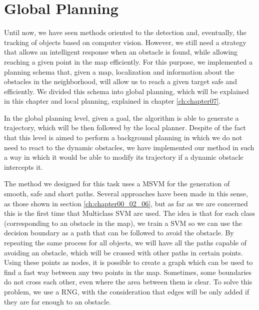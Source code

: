 
\graphicspath{{./images/chapter06/bmps/}{./images/chapter06/vects/}{./images/chapter06/}}

\chapter{Global Planning}\label{ch:chapter06}

Until now, we have seen methods oriented to the detection and, eventually, the tracking of objects based on computer vision. However, we still need a strategy that allows an intelligent response when an obstacle is found, while allowing reaching a given point in the map efficiently. For this purpose, we implemented a planning schema that, given a map, localization and information about the obstacles in the neighborhood, will allow us to reach a given target safe and efficiently. We divided this schema into global planning, which will be explained in this chapter and local planning, explained in chapter \ref{ch:chapter07}.

In the global planning level, given a goal, the algorithm is able to generate a trajectory, which will be then followed by the local planner. Despite of the fact that this level is aimed to perform a background planning in which we do not need to react to the dynamic obstacles, we have implemented our method in such a way in which it would be able to modify its trajectory if a dynamic obstacle intercepts it.

The method we designed for this task uses a \ac{MSVM} for the generation of smooth, safe and short paths. Several approaches have been made in this sense, as those shown in section \ref{ch:chapter00_02_06}, but as far as we are concerned this is the first time that Multiclass \acs{SVM} are used. The idea is that for each class (corresponding to an obstacle in the map), we train a \ac{SVM} so we can use the decision boundary as a path that can be followed to avoid the obstacle. By repeating the same process for all objects, we will have all the paths capable of avoiding an obstacle, which will be crossed with other paths in certain points. Using these points as nodes, it is possible to create a graph which can be used to find a fast way between any two points in the map. Sometimes, some boundaries do not cross each other, even where the area between them is clear. To solve this problem, we use a \ac{RNG}, with the consideration that edges will be only added if they are far enough to an obstacle.

